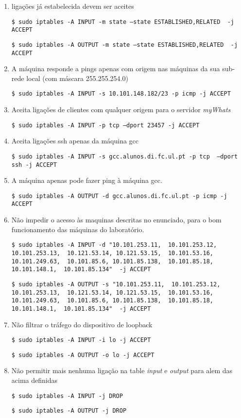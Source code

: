 \documentclass[12pt, a4paper, twoside]{report} %
\begin{document}
\begin{enumerate}

\item ligações já estabelecida devem ser aceites

\texttt{\$ sudo iptables -A INPUT -m state --state ESTABLISHED,RELATED \
 -j ACCEPT}

\texttt{\$ sudo iptables -A OUTPUT -m state --state ESTABLISHED,RELATED \
 -j ACCEPT}

\item A máquina responde a pings apenas com origem nas máquinas da sua sub-rede local (com máscara 255.255.254.0)

\texttt{\$ sudo iptables -A INPUT -s 10.101.148.182/23 -p icmp -j ACCEPT}

\item Aceita ligações de clientes com qualquer origem para o servidor \textit{myWhats}

\texttt{\$ sudo iptables -A INPUT -p tcp --dport 23457 -j ACCEPT}

\item Aceita ligações ssh apenas da máquina gcc

\texttt{\$ sudo iptables -A INPUT -s gcc.alunos.di.fc.ul.pt -p tcp \
 --dport ssh -j ACCEPT}

\item A máquina apenas pode fazer ping à máquina gcc.

\texttt{\$ sudo iptables -A OUTPUT -d gcc.alunos.di.fc.ul.pt -p icmp -j ACCEPT}

\clearpage

\item Não impedir o acesso às maquinas descritas no enunciado, para o bom funcionamento das máquinas do laboratório.


\texttt{\$ sudo iptables -A INPUT -d "10.101.253.11, \
	10.101.253.12, 10.101.253.13, \
	10.121.53.14, 10.121.53.15, \
	10.101.53.16, 10.101.249.63, \
	10.101.85.6, 10.101.85.138, \
	10.101.85.18, 10.101.148.1, \
	10.101.85.134" \ -j ACCEPT}

\texttt{\$ sudo iptables -A OUTPUT -s "10.101.253.11, \
	10.101.253.12, 10.101.253.13, \
	10.121.53.14, 10.121.53.15, \
	10.101.53.16, 10.101.249.63, \
	10.101.85.6, 10.101.85.138, \
	10.101.85.18, 10.101.148.1, \
	10.101.85.134" \ -j ACCEPT}

\item Não filtrar o tráfego do dispositivo de loopback

\texttt{\$ sudo iptables -A INPUT -i lo -j ACCEPT}

\texttt{\$ sudo iptables -A OUTPUT -o lo -j ACCEPT}

\item Não permitir mais nenhuma ligação na table \textit{input} e \textit{output} para alem das acima definidas

\texttt{\$ sudo iptables -A INPUT  -j DROP}

\texttt{\$ sudo iptables -A OUTPUT -j DROP}

\end{enumerate}
\end{document}

